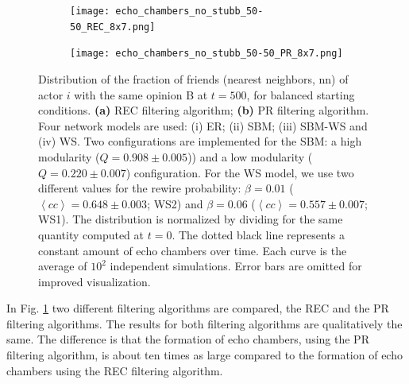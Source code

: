 \documentclass[11 pt , letterpaper , twoside , openright]{book}
\begin{document}
\begin{figure}[H]
  \begin{subfigure}[b]{0.49\textwidth}
    \caption{}
  	\texttt{[image: echo\_chambers\_no\_stubb\_50-50\_REC\_8x7.png]}
      \end{subfigure}
  \begin{subfigure}[b]{0.49\textwidth}
    \caption{}
  	\texttt{[image: echo\_chambers\_no\_stubb\_50-50\_PR\_8x7.png]}
  \end{subfigure}
  \captionsetup{format=plain}
  \caption[Distribution of the fraction of friends (nearest neighbors, nn) of actor $i$ with the same opinion B at $t=500$, $\left<P_{\text{B}}^{\text{nn}}\right>$, for balanced starting conditions.]{Distribution of the fraction of friends (nearest neighbors, nn) of actor $i$ with the same opinion B at $t = 500$, for balanced starting conditions. \textbf{(a)} REC filtering algorithm; \textbf{(b)} PR filtering algorithm. Four network models are used: (i) ER; (ii) SBM; (iii) SBM-WS and (iv) WS. Two configurations are implemented for the SBM: a high modularity ($Q = 0.908 \pm 0.005$)) and a low modularity ($Q = 0.220 \pm 0.007$) configuration. For the WS model, we use two different values for the rewire probability: $\beta = 0.01$ ($\left<cc\right> = 0.648 \pm 0.003$; WS2) and $\beta = 0.06$ ($\left<cc\right> = 0.557 \pm 0.007$; WS1). The distribution is normalized by dividing for the same quantity computed at $t=0$. The dotted black line represents a constant amount of echo chambers over time. Each curve is the average of $10^2$ independent simulations. Error bars are omitted for improved visualization.}
\label{echo_50_50}
\end{figure}
\noindent
In Fig. \ref{echo_50_50} two different filtering algorithms are compared, the REC and the PR filtering algorithms. The results for both filtering algorithms are qualitatively the same. The difference is that the formation of echo chambers, using the PR filtering algorithm, is about ten times as large compared to the formation of echo chambers using the REC filtering algorithm. \\
\newline
\end{document}
